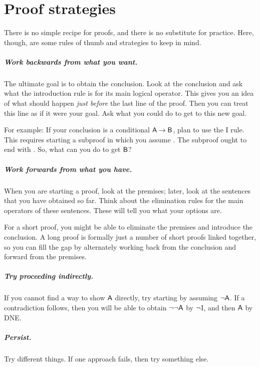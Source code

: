 \chapter{Proof strategies}
There is no simple recipe for proofs, and there is no substitute for practice. Here, though, are some rules of thumb and strategies to keep in mind.

\paragraph{Work backwards from what you want.}
The ultimate goal is to obtain the conclusion. Look at the conclusion and ask what the introduction rule is for its main logical operator. This gives you an idea of what should happen \emph{just before} the last line of the proof. Then you can treat this line as if it were your goal. Ask what you could do to get to this new goal.

For example: If your conclusion is a conditional $\mathsf{A}\rightarrow\mathsf{B}$, plan to use the {\eif}I rule. This requires starting a subproof in which you assume . The subproof ought to end with . So, what can you do to get $\mathsf{B}$?

\paragraph{Work forwards from what you have.}
When you are starting a proof, look at the premises; later, look at the sentences that you have obtained so far. Think about the elimination rules for the main operators of these sentences. These will tell you what your options are.

For a short proof, you might be able to eliminate the premises and introduce the conclusion. A long proof is formally just a number of short proofs linked together, so you can fill the gap by alternately working back from the conclusion and forward from the premises.

\paragraph{Try proceeding indirectly.}
If you cannot find a way to show $\mathsf{A}$ directly, try starting by assuming ${\neg} \mathsf{A}$. If a contradiction follows, then you will be able to obtain ${\neg} {\neg} \mathsf{A}$ by ${\neg}$I, and then $\mathsf{A}$ by DNE.  

\paragraph{Persist.}
Try different things. If one approach fails, then try something else.


